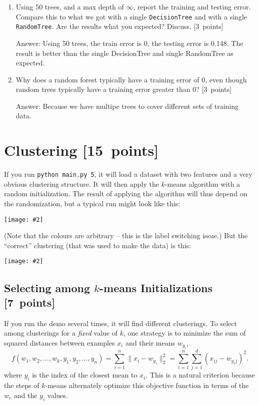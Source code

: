 \documentclass{article}
\newcommand{\blu}[1]{{\textcolor{blu}{#1}}}
\newcommand{\gre}[1]{\textcolor{gre}{#1}}
\newcommand\ans[1]{\par\gre{Answer: #1}}
\newenvironment{answer}{\par\begingroup\color{gre}Answer: }{\endgroup}
\let\ask\blu
\newcommand\pts[1]{\textcolor{pointscolour}{[#1~points]}}
\newcommand{\norm}[1]{\lVert #1 \rVert}
\newcommand{\centerfig}[2]{\begin{center}\texttt{[image: \#2]}\end{center}}
\begin{document}
\begin{enumerate}
\begin{answer}
\begin{verbatim}
            \end{verbatim}
        \end{answer}
        \item Using 50 trees, and a max depth of $\infty$, \ask{report the training and testing error}. Compare this to what we got with a single \texttt{DecisionTree} and with a single \texttt{RandomTree}. \ask{Are the results what you expected? Discuss.} \pts{3}
        \ans{Using 50 trees, the train error is 0, the testing error is 0.148. The result is better than the single DecisionTree and single RandomTree as expected.}
        \item \ask{Why does a random forest typically have a training error of 0, even though random trees typically have a training error greater than 0?} \pts{3}
        \ans{Because we have multipe trees to cover different sets of training data.}
    \end{enumerate}


    \clearpage
    \section{Clustering \pts{15}}

    If you run \verb|python main.py 5|, it will load a dataset with two features
    and a very obvious clustering structure. It will then apply the $k$-means algorithm
    with a random initialization. The result of applying the
    algorithm will thus depend on the randomization, but a typical run might look like this:
    \centerfig{.5}{figs/kmeans_basic.png}
    (Note that the colours are arbitrary -- this is the label switching issue.)
    But the ``correct'' clustering (that was used to make the data) is this:
    \centerfig{.5}{figs/kmeans_good.png}


    \subsection{Selecting among $k$-means Initializations \pts{7}}

    If you run the demo several times, it will find different clusterings. To select among clusterings for a \emph{fixed} value of $k$, one strategy is to minimize the sum of squared distances between examples $x_i$ and their means $w_{y_i}$,
    \[
    f(w_1,w_2,\dots,w_k,y_1,y_2,\dots,y_n) = \sum_{i=1}^n \norm{x_i - w_{y_i}}_2^2 = \sum_{i=1}^n \sum_{j=1}^d (x_{ij} - w_{y_ij})^2.
    \]
    where $y_i$ is the index of the closest mean to $x_i$. This is a natural criterion because the steps of $k$-means alternately optimize this objective function in terms of the $w_c$ and the $y_i$ values.
\end{document}
